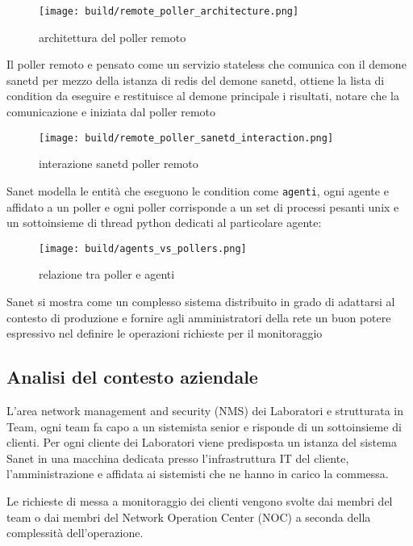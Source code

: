 \begin{figure}[H]
    \centering
    \texttt{[image: build/remote\_poller\_architecture.png]}
    \caption{architettura del poller remoto}
    \label{fig:enter-label} \end{figure}

Il poller remoto e pensato come un servizio stateless che comunica con il demone sanetd per mezzo della istanza di redis del demone sanetd, ottiene la lista di condition da eseguire e restituisce al demone principale i risultati, notare che la comunicazione e iniziata dal poller remoto


\begin{figure}[H]
    \centering
    \texttt{[image: build/remote\_poller\_sanetd\_interaction.png]}
    \caption{interazione sanetd poller remoto}
    \label{fig:enter-label}
\end{figure}

Sanet modella le entità che eseguono le condition come \verb|agenti|, ogni agente e affidato a un poller e ogni poller corrisponde a un set di processi pesanti unix e un sottoinsieme di thread python dedicati al particolare agente:


\begin{figure}[H]
    \centering
    \texttt{[image: build/agents\_vs\_pollers.png]}
    \caption{relazione tra poller e agenti}
    \label{fig:enter-label}
\end{figure}

Sanet si mostra come un complesso sistema distribuito in grado di adattarsi al contesto di produzione e fornire agli amministratori della rete un buon potere espressivo nel definire le operazioni richieste per il monitoraggio

\newpage
\subsection{Analisi del contesto aziendale}

L'area network management and security (NMS) dei Laboratori e strutturata in Team, ogni team fa capo a un sistemista senior e risponde di un sottoinsieme di clienti. Per ogni cliente dei Laboratori viene predisposta un istanza del sistema Sanet in una macchina dedicata presso l'infrastruttura IT del cliente, l'amministrazione e affidata ai sistemisti che ne hanno in carico la commessa.

Le richieste di messa a monitoraggio dei clienti vengono svolte dai membri del team o dai membri del Network Operation Center (NOC) a seconda della complessità dell'operazione.

